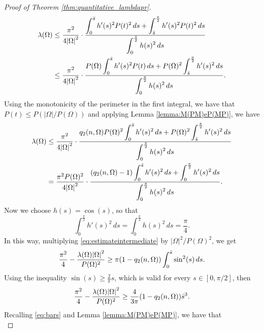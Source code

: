 \documentclass[oneside,a4paper,11pt,notitlepage]{article}
\newcommand{\abs}[1]{{\left|#1\right|}}
\theoremstyle{definition}
\theoremstyle{plain}
\theoremstyle{definition}
\begin{document}
\begin{proof}[Proof of Theorem \ref{thm:quantitative_lambdapr}]
\begin{equation*}
\begin{split}
    \lambda(\Omega) &\le \frac{\pi^2}{4\abs{\Omega}^2}\cdot\frac{\displaystyle \int_{0}^{\Bar{s}}h'(s)^2P(t)^2\,ds +\int_{\Bar{s}}^{\frac{\pi}{2}}h'(s)^2P(t)^2\,ds}{\displaystyle\int_0^{\frac{\pi}{2}}h(s)^2\,ds}\\
    &\le\frac{\pi^2}{4\abs{\Omega}^2}\cdot\frac{\displaystyle P(\Omega)\int_{0}^{\Bar{s}}h'(s)^2P(t)\,ds +P(\Omega)^2\int_{\Bar{s}}^{\frac{\pi}{2}}h'(s)^2\,ds}{\displaystyle\int_0^{\frac{\pi}{2}}h(s)^2\,ds}.
    \end{split}
\end{equation*}
Using the monotonicity of the perimeter in the first integral, we have that $P(t)\le P(\abs{\Omega}/P(\Omega))$ and applying Lemma \ref{lemma:M(PM)eP(MP)}, we have
\begin{equation}\label{eq:estimateintermediate}
\begin{split}
    \lambda(\Omega) &\le\frac{\pi^2}{4\abs{\Omega}^2}\cdot\frac{\displaystyle q_2(n,\Omega)P(\Omega)^2\int_{0}^{\Bar{s}}h'(s)^2\,ds +P(\Omega)^2\int_{\Bar{s}}^{\frac{\pi}{2}}h'(s)^2\,ds}{\displaystyle\int_0^{\frac{\pi}{2}}h(s)^2\,ds}\\
    &=\frac{\pi^2P(\Omega)^2}{4\abs{\Omega}^2}\cdot\frac{\displaystyle (q_2(n,\Omega)-1)\int_{0}^{\Bar{s}}h'(s)^2\,ds +\int_{0}^{\frac{\pi}{2}}h'(s)^2\,ds}{\displaystyle\int_0^{\frac{\pi}{2}}h(s)^2\,ds}.
\end{split}
\end{equation}
Now we choose $h(s)=\cos(s)$, so that
\begin{equation*}
    \int_0^\frac{\pi}{2}h'(s)^2\,ds=\int_0^\frac{\pi}{2}h(s)^2\,ds= \frac{\pi}{4}.
\end{equation*}
In this way, multiplying \eqref{eq:estimateintermediate} by $\abs{\Omega}^2/P(\Omega)^2$, we get
\begin{equation*}
    \frac{\pi^2}{4}-\frac{\lambda(\Omega)\abs{\Omega}^2}{P(\Omega)^2}\ge\pi (1-q_2(n,\Omega))\int_0^{\Bar{s}}\sin^2(s)\,ds. 
\end{equation*}
Using the inequality $\sin(s)\ge \frac{2}{\pi}s$, which is valid for every $s\in [0,\pi/2]$, then 
\begin{equation}\label{eq:estimatebars3}
    \frac{\pi^2}{4}-\frac{\lambda(\Omega)\abs{\Omega}^2}{P(\Omega)^2}\ge\frac{4}{3\pi}(1-q_2(n,\Omega))\Bar{s}^3.
\end{equation}
Recalling \eqref{eq:bars} and Lemma \ref{lemma:M(PM)eP(MP)}, we have that
\begin{equation}\label{eq:estimatebars}

\end{equation}
\end{proof}
\end{document}
